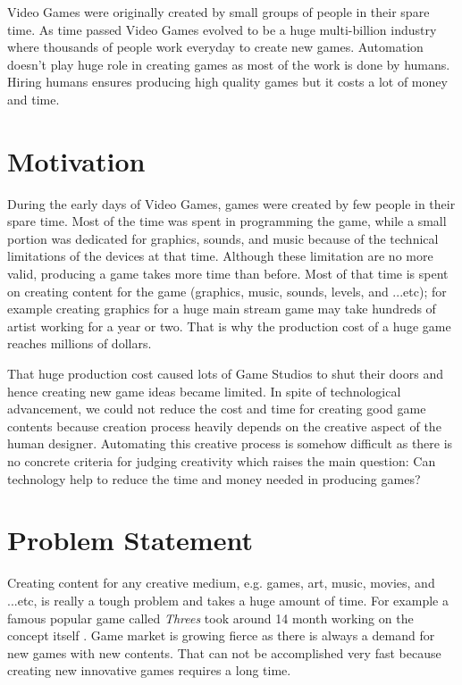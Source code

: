 Video Games were originally created by small groups of people in their spare time. As time passed Video Games evolved to be a huge multi-billion industry where thousands of people work everyday to create new games. Automation doesn't play huge role in creating games as most of the work is done by humans. Hiring humans ensures producing high quality games but it costs a lot of money and time.

\section{Motivation}
During the early days of Video Games, games were created by few people in their spare time. Most of the time was spent in programming the game, while a small portion was dedicated for graphics, sounds, and music because of the technical limitations of the devices at that time. Although these limitation are no more valid, producing a game takes more time than before. Most of that time is spent on creating content for the game (graphics, music, sounds, levels, and ...etc)\cite{budgetAAA}; for example creating graphics for a huge main stream game may take hundreds of artist working for a year or two. That is why the production cost of a huge game reaches millions of dollars\cite{gameCost}.\\\par

That huge production cost caused lots of Game Studios to shut their doors \cite{gameCloses} and hence creating new game ideas became limited. In spite of technological advancement, we could not reduce the cost and time for creating good game contents because creation process heavily depends on the creative aspect of the human designer. Automating this creative process is somehow difficult as there is no concrete criteria for judging creativity which raises the main question: Can technology help to reduce the time and money needed in producing games?

\section{Problem Statement}
Creating content for any creative medium, e.g. games, art, music, movies, and ...etc, is really a tough problem and takes a huge amount of time. For example a famous popular game called \emph{Threes} took around 14 month working on the concept itself \cite{threesTime}. Game market is growing fierce as there is always a demand for new games with new contents. That can not be accomplished very fast because creating new innovative games requires a long time.\\\par

